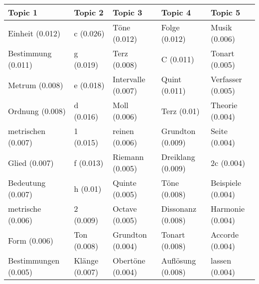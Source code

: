 \begin{tabular}{lllll}
\toprule
             Topic 1 &        Topic 2 &            Topic 3 &           Topic 4 &           Topic 5 \\
\midrule
     Einheit (0.012) &      c (0.026) &       Töne (0.012) &     Folge (0.012) &     Musik (0.006) \\
  Bestimmung (0.011) &      g (0.019) &       Terz (0.008) &         C (0.011) &    Tonart (0.005) \\
      Metrum (0.008) &      e (0.018) & Intervalle (0.007) &     Quint (0.011) & Verfasser (0.005) \\
     Ordnung (0.008) &      d (0.016) &       Moll (0.006) &       Terz (0.01) &   Theorie (0.004) \\
  metrischen (0.007) &      1 (0.015) &     reinen (0.006) &  Grundton (0.009) &     Seite (0.004) \\
       Glied (0.007) &      f (0.013) &    Riemann (0.005) & Dreiklang (0.009) &        2c (0.004) \\
   Bedeutung (0.007) &       h (0.01) &     Quinte (0.005) &      Töne (0.008) & Beispiele (0.004) \\
   metrische (0.006) &      2 (0.009) &     Octave (0.005) & Dissonanz (0.008) &  Harmonie (0.004) \\
        Form (0.006) &    Ton (0.008) &   Grundton (0.004) &    Tonart (0.008) &   Accorde (0.004) \\
Bestimmungen (0.005) & Klänge (0.007) &   Obertöne (0.004) & Auflösung (0.008) &    lassen (0.004) \\
\bottomrule
\end{tabular}
